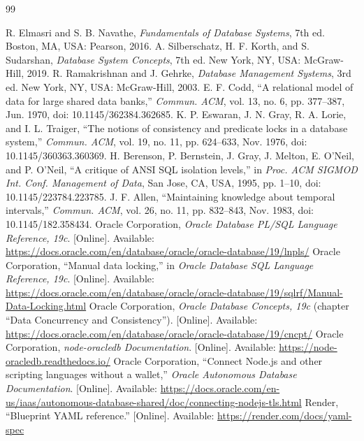 \documentclass[12pt,a4paper,oneside]{report}
\renewcommand{\_}{\origus\allowbreak}
\begin{document}
\begin{thebibliography}{99}
 R. Elmasri and S. B. Navathe, \textit{Fundamentals of Database Systems}, 7th ed. Boston, MA, USA: Pearson, 2016.
 A. Silberschatz, H. F. Korth, and S. Sudarshan, \textit{Database System Concepts}, 7th ed. New York, NY, USA: McGraw-Hill, 2019.
 R. Ramakrishnan and J. Gehrke, \textit{Database Management Systems}, 3rd ed. New York, NY, USA: McGraw-Hill, 2003.
 E. F. Codd, ``A relational model of data for large shared data banks,'' \textit{Commun. ACM}, vol. 13, no. 6, pp. 377--387, Jun. 1970, doi: 10.1145/362384.362685.
 K. P. Eswaran, J. N. Gray, R. A. Lorie, and I. L. Traiger, ``The notions of consistency and predicate locks in a database system,'' \textit{Commun. ACM}, vol. 19, no. 11, pp. 624--633, Nov. 1976, doi: 10.1145/360363.360369.
 H. Berenson, P. Bernstein, J. Gray, J. Melton, E. O'Neil, and P. O'Neil, ``A critique of ANSI SQL isolation levels,'' in \textit{Proc. ACM SIGMOD Int. Conf. Management of Data}, San Jose, CA, USA, 1995, pp. 1--10, doi: 10.1145/223784.223785.
 J. F. Allen, ``Maintaining knowledge about temporal intervals,'' \textit{Commun. ACM}, vol. 26, no. 11, pp. 832--843, Nov. 1983, doi: 10.1145/182.358434.
 Oracle Corporation, \textit{Oracle Database PL/SQL Language Reference, 19c}. [Online]. Available: \url{https://docs.oracle.com/en/database/oracle/oracle-database/19/lnpls/}
 Oracle Corporation, ``Manual data locking,'' in \textit{Oracle Database SQL Language Reference, 19c}. [Online]. Available: \url{https://docs.oracle.com/en/database/oracle/oracle-database/19/sqlrf/Manual-Data-Locking.html}
 Oracle Corporation, \textit{Oracle Database Concepts, 19c} (chapter ``Data Concurrency and Consistency''). [Online]. Available: \url{https://docs.oracle.com/en/database/oracle/oracle-database/19/cncpt/}
 Oracle Corporation, \textit{node-oracledb Documentation}. [Online]. Available: \url{https://node-oracledb.readthedocs.io/}
 Oracle Corporation, ``Connect Node.js and other scripting languages without a wallet,'' \textit{Oracle Autonomous Database Documentation}. [Online]. Available: \url{https://docs.oracle.com/en-us/iaas/autonomous-database-shared/doc/connecting-nodejs-tls.html}
 Render, ``Blueprint YAML reference.'' [Online]. Available: \url{https://render.com/docs/yaml-spec}
\end{thebibliography}
\end{document}
